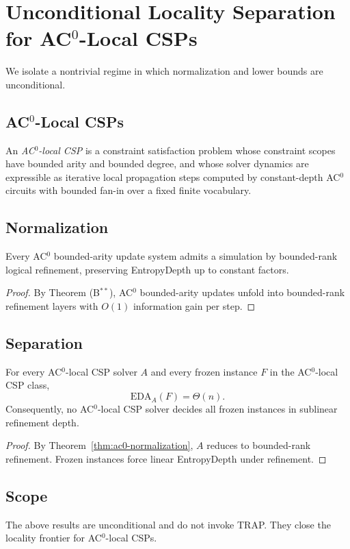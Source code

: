 \section{Unconditional Locality Separation for AC$^0$-Local CSPs}

We isolate a nontrivial regime in which normalization and lower bounds
are unconditional.

\subsection{AC$^0$-Local CSPs}

An \emph{AC$^0$-local CSP} is a constraint satisfaction problem whose
constraint scopes have bounded arity and bounded degree, and whose
solver dynamics are expressible as iterative local propagation steps
computed by constant-depth AC$^0$ circuits with bounded fan-in over a
fixed finite vocabulary.

\subsection{Normalization}

\begin{theorem}[AC$^0$ Normalization]\label{thm:ac0-normalization}
Every AC$^0$ bounded-arity update system admits a simulation by
bounded-rank logical refinement, preserving EntropyDepth up to constant
factors.
\end{theorem}

\begin{proof}
By Theorem (B$^{**}$), AC$^0$ bounded-arity updates unfold into
bounded-rank refinement layers with $O(1)$ information gain per step.
\end{proof}

\subsection{Separation}

\begin{theorem}\label{thm:ac0-separation}
For every AC$^0$-local CSP solver $A$ and every frozen instance $F$ in the
AC$^0$-local CSP class,
\[
\mathrm{EDA}_A(F) = \Theta(n).
\]
Consequently, no AC$^0$-local CSP solver decides all frozen instances in
sublinear refinement depth.
\end{theorem}

\begin{proof}
By Theorem~\ref{thm:ac0-normalization}, $A$ reduces to bounded-rank
refinement. Frozen instances force linear EntropyDepth under refinement.
\end{proof}

\subsection{Scope}

The above results are unconditional and do not invoke TRAP.
They close the locality frontier for AC$^0$-local CSPs.

